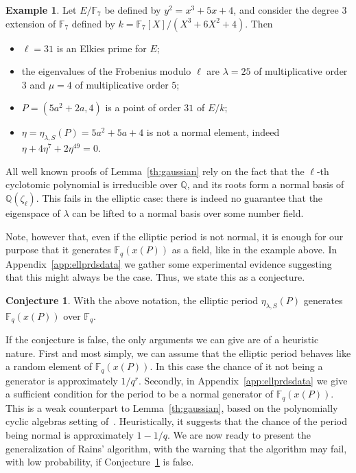 \documentclass[12pt]{article}
\theoremstyle{plain}
\theoremstyle{definition}
\newtheorem{conjecture}[theorem]{Conjecture}
\newtheorem{example}[theorem]{Example}
\def\Q{\ensuremath{\mathbb{Q}}}
\def\F{\ensuremath{\mathbb{F}}}
\newcounter{algorithm}
\begin{document}
\begin{example}
\label{ex:non-normal}
  Let $E/\F_7$ be defined by $y^2 = x^3 + 5 x + 4$, and consider the
  degree $3$ extension of $\F_7$ defined by
  $k=\F_7[X]/(X^3 + 6 X^2 + 4)$. Then
  \begin{itemize}
  \item $\ell = 31$ is an Elkies prime for $E$;
  \item the eigenvalues of the Frobenius modulo $\ell$ are
    $\lambda = 25$ of multiplicative order $3$ and $\mu = 4$ of
    multiplicative order $5$;
  \item $P = (5 a^2+2 a, 4)$ is a point of order $31$ of $E/k$;
  \item $\eta=\eta_{\lambda,S}(P) = 5 a^2 + 5 a + 4$ is not a normal
    element, indeed
    $\eta + 4 \eta^7 + 2 \eta^{49} = 0$.
  \end{itemize}
\end{example}

All well known proofs of Lemma~\ref{th:gaussian} rely on the fact that
the $\ell$-th cyclotomic polynomial is irreducible over $\Q$, and its
roots form a normal basis of $\Q(\zeta_\ell)$. %
This fails in the elliptic case: there is indeed no guarantee that the
eigenspace of $\lambda$ can be lifted to a normal basis over some
number field.

Note, however that, even if the elliptic period is not normal, it is
enough for our purpose that it generates $\F_q(x(P))$ as a field, like
in the example above.  In Appendix~\ref{app:ellprdsdata} we gather
some experimental evidence suggesting that this might always be the
case. Thus, we state this as a conjecture.

\begin{conjecture}
\label{conj:ellperiods}
With the above notation, the elliptic period $\eta_{\lambda,S}(P)$
generates $\F_q(x(P))$ over $\F_q$.
\end{conjecture}

If the conjecture is false, the only arguments we can give are of a
heuristic nature. First and most simply, we can assume that the
elliptic period behaves like a random element of $\F_q(x(P))$. In this
case the chance of it not being a generator is approximately
$1/q^r$. %
Secondly, in Appendix~\ref{app:ellprdsdata} we give a sufficient
condition for the period to be a normal generator of
$\F_q(x(P))$. This is a weak counterpart to Lemma~\ref{th:gaussian},
based on the polynomially cyclic algebras setting
of~\cite{Mihailescu2010825}. Heuristically, it suggests that the
chance of the period being normal is approximately $1-1/q$. %
We are now ready to present the generalization of Rains' algorithm,
with the warning that the algorithm may fail, with low probability, if
Conjecture~\ref{conj:ellperiods} is false.
\end{document}
